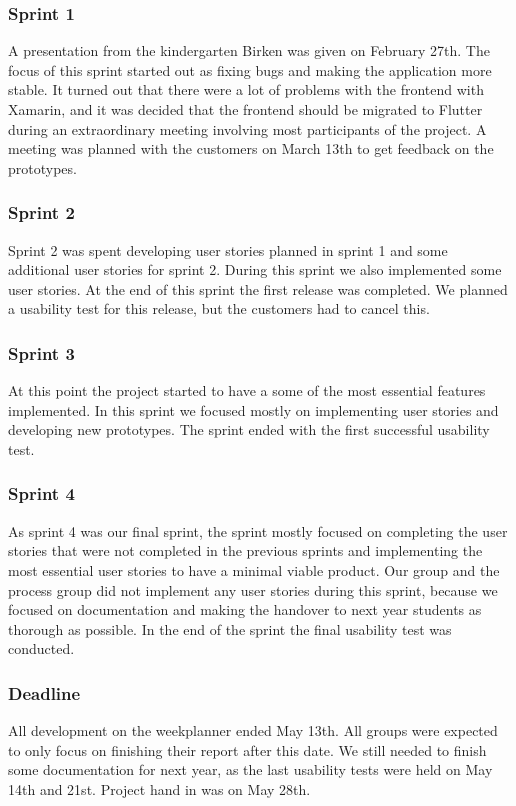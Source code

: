\subsubsection{Sprint 1}
A presentation from the kindergarten Birken was given on February 27th.
The focus of this sprint started out as fixing bugs and making the application more stable.
It turned out that there were a lot of problems with the frontend with Xamarin, and it was decided that the frontend should be migrated to Flutter during an extraordinary meeting involving most participants of the project.
A meeting was planned with the customers on March 13th to get feedback on the prototypes. 

\subsubsection{Sprint 2}
Sprint 2 was spent developing user stories planned in sprint 1 and some additional user stories for sprint 2.
During this sprint we also implemented some user stories.
At the end of this sprint the first release was completed.
We planned a usability test for this release, but the customers had to cancel this.

\subsubsection{Sprint 3}
At this point the project started to have a some of the most essential features implemented.
In this sprint we focused mostly on implementing user stories and developing new prototypes. 
The sprint ended with the first successful usability test.

\subsubsection{Sprint 4}
As sprint 4 was our final sprint, the sprint mostly focused on completing the user stories that were not completed in the previous sprints and implementing the most essential user stories to have a minimal viable product.
Our group and the process group did not implement any user stories during this sprint, because we focused on documentation and making the handover to next year students as thorough as possible.
In the end of the sprint the final usability test was conducted.

\subsubsection{Deadline}
All development on the weekplanner ended May 13th.
All groups were expected to only focus on finishing their report after this date.
We still needed to finish some documentation for next year, as the last usability tests were held on May 14th and 21st.
Project hand in was on May 28th.
